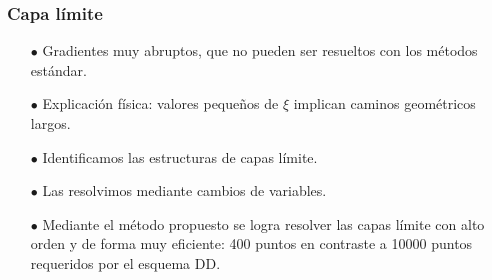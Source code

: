 
\begin{frame}
\frametitle{Capa límite}


       \begin{itemize}
           \item[$\bullet$] Gradientes
muy abruptos, que no pueden ser resueltos con los métodos estándar.

 
           \item[$\bullet$] Explicación física: valores pequeños de $\xi$ implican caminos geométricos largos.

           \item[$\bullet$] Identificamos las estructuras 
de capas límite.

           \item[$\bullet$] Las resolvimos mediante cambios de variables.

           \item[$\bullet$] Mediante el método propuesto 
           se logra resolver las capas límite con alto orden 
           y de forma muy eficiente: 400 puntos en contraste a 10000 puntos 
           requeridos por el esquema DD.
          
      \end{itemize}


\end{frame}

